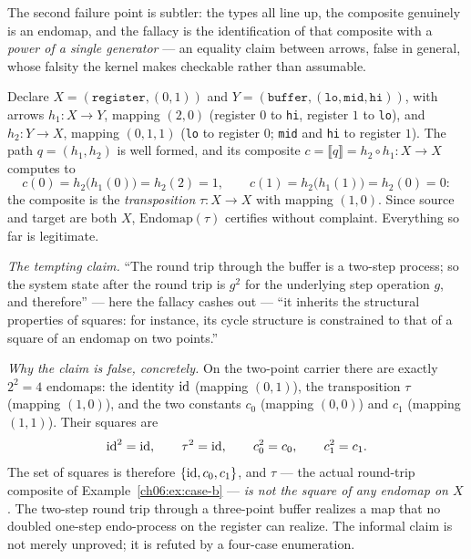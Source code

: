 The second failure point is subtler: the types all line up, the composite
genuinely is an endomap, and the fallacy is the identification of that
composite with a \emph{power of a single generator} --- an equality claim
between arrows, false in general, whose falsity the kernel makes checkable
rather than assumable.

\begin{example}[Setup]
\label{ch06:ex:case-b}
Declare $X = (\texttt{register}, (0, 1))$ and
$Y = (\texttt{buffer}, (\texttt{lo}, \texttt{mid}, \texttt{hi}))$, with
arrows $h_1 : X \to Y$, mapping $(2, 0)$ (register $0$ to \texttt{hi},
register $1$ to \texttt{lo}), and $h_2 : Y \to X$, mapping $(0, 1, 1)$
(\texttt{lo} to register $0$; \texttt{mid} and \texttt{hi} to register
$1$). The path $q = (h_1, h_2)$ is well formed, and its composite
$c = \llbracket q \rrbracket = h_2 \circ h_1 : X \to X$ computes to
\[
  c(0) = h_2\bigl(h_1(0)\bigr) = h_2(2) = 1,
  \qquad
  c(1) = h_2\bigl(h_1(1)\bigr) = h_2(0) = 0 :
\]
the composite is the \emph{transposition} $\tau : X \to X$ with mapping
$(1, 0)$. Since source and target are both $X$,
$\mathrm{Endomap}(\tau)$ certifies without complaint. Everything so far
is legitimate.
\end{example}

\emph{The tempting claim.} ``The round trip through the buffer is a
two-step process; so the system state after the round trip is $g^{2}$ for
the underlying step operation $g$, and therefore'' --- here the fallacy
cashes out --- ``it inherits the structural properties of squares: for
instance, its cycle structure is constrained to that of a square of an
endomap on two points.''

\emph{Why the claim is false, concretely.} On the two-point carrier there
are exactly $2^{2} = 4$ endomaps: the identity $\mathrm{id}$ (mapping $(0,1)$),
the transposition $\tau$ (mapping $(1,0)$), and the two constants $c_0$
(mapping $(0,0)$) and $c_1$ (mapping $(1,1)$). Their squares are
\[
  \mathrm{id}^{2} = \mathrm{id}, \qquad
  \tau^{2} = \mathrm{id}, \qquad
  c_0^{2} = c_0, \qquad
  c_1^{2} = c_1 .
\]
The set of squares is therefore $\{\mathrm{id}, c_0, c_1\}$, and $\tau$ --- the
actual round-trip composite of Example~\ref{ch06:ex:case-b} --- \emph{is
not the square of any endomap on $X$}. The two-step round trip through a
three-point buffer realizes a map that no doubled one-step endo-process on
the register can realize. The informal claim is not merely unproved; it is
refuted by a four-case enumeration.

